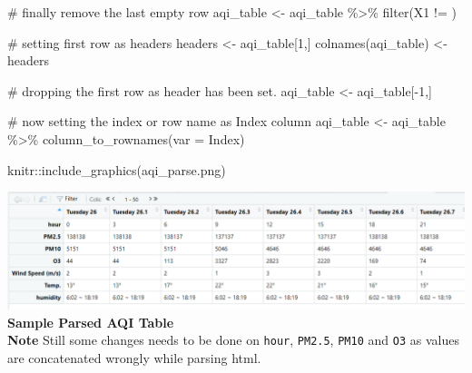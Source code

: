 \documentclass[
]{article}
\newenvironment{Shaded}{}{}
\newcommand{\AttributeTok}[1]{#1}
\newcommand{\CommentTok}[1]{\textcolor[rgb]{0.30,0.53,0.42}{#1}}
\newcommand{\DecValTok}[1]{\textcolor[rgb]{0.00,0.00,0.80}{#1}}
\newcommand{\FunctionTok}[1]{#1}
\newcommand{\NormalTok}[1]{#1}
\newcommand{\OtherTok}[1]{\textcolor[rgb]{1.00,0.25,0.00}{#1}}
\newcommand{\SpecialCharTok}[1]{\textcolor[rgb]{0.00,0.50,0.50}{#1}}
\newcommand{\StringTok}[1]{\textcolor[rgb]{0.01,0.42,0.03}{#1}}
\begin{document}
\begin{Shaded}
\begin{Highlighting}[]
\CommentTok{\# finally remove the last empty row}
\NormalTok{aqi\_table }\OtherTok{\textless{}{-}}\NormalTok{ aqi\_table }\SpecialCharTok{\%\textgreater{}\%} \FunctionTok{filter}\NormalTok{(X1 }\SpecialCharTok{!=} \StringTok{\textquotesingle{}\textquotesingle{}}\NormalTok{)}

\CommentTok{\# setting first row as headers}
\NormalTok{headers }\OtherTok{\textless{}{-}}\NormalTok{ aqi\_table[}\DecValTok{1}\NormalTok{,]}
\FunctionTok{colnames}\NormalTok{(aqi\_table) }\OtherTok{\textless{}{-}}\NormalTok{ headers}

\CommentTok{\# dropping the first row as header has been set.}
\NormalTok{aqi\_table }\OtherTok{\textless{}{-}}\NormalTok{ aqi\_table[}\SpecialCharTok{{-}}\DecValTok{1}\NormalTok{,]}

\CommentTok{\# now setting the index or row name as \textquotesingle{}Index\textquotesingle{} column}
\NormalTok{aqi\_table }\OtherTok{\textless{}{-}}\NormalTok{ aqi\_table }\SpecialCharTok{\%\textgreater{}\%} \FunctionTok{column\_to\_rownames}\NormalTok{(}\AttributeTok{var =} \StringTok{\textquotesingle{}Index\textquotesingle{}}\NormalTok{)}

\NormalTok{knitr}\SpecialCharTok{::}\FunctionTok{include\_graphics}\NormalTok{(}\StringTok{\textquotesingle{}aqi\_parse.png\textquotesingle{}}\NormalTok{)}
\end{Highlighting}
\end{Shaded}

\includegraphics[width=1\linewidth]{aqi_parse} \textbf{Sample Parsed AQI
Table}\\
\textbf{Note} Still some changes needs to be done on \texttt{hour},
\texttt{PM2.5}, \texttt{PM10} and \texttt{O3} as values are concatenated
wrongly while parsing html.
\end{document}
